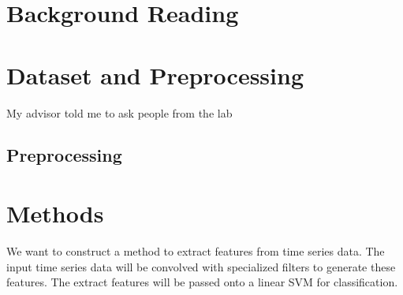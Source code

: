 \documentclass[11pt,letterpaper]{article}
\numberwithin{equation}{section} %
\numberwithin{figure}{section} %
\numberwithin{table}{section} %
\begin{document}
\section{Background Reading}


\section{Dataset and Preprocessing} %
\label{sec:dataset_and_preprocessing}

\begin{tip}My advisor told me to ask people from the lab\end{tip}

\subsection{Preprocessing} %
\label{sub:preprocessing}

\section{Methods} %
\label{sec:methods}
We want to construct a method to extract features from time series data. The input time series data will be convolved with specialized filters to generate these features. The extract features will be passed onto a linear SVM for classification. 
\end{document}
